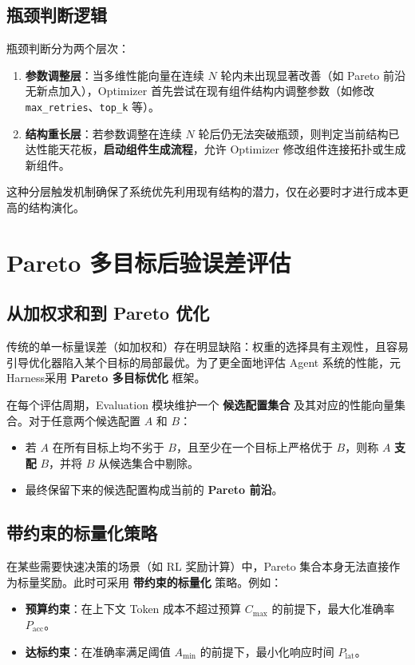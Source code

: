 \subsection{瓶颈判断逻辑}

瓶颈判断分为两个层次：

\begin{enumerate}
    \item \textbf{参数调整层}：当多维性能向量在连续 $N$ 轮内未出现显著改善（如 Pareto 前沿无新点加入），Optimizer 首先尝试在现有组件结构内调整参数（如修改 \texttt{max\_retries}、\texttt{top\_k} 等）。
    \item \textbf{结构重长层}：若参数调整在连续 $N$ 轮后仍无法突破瓶颈，则判定当前结构已达性能天花板，\textbf{启动组件生成流程}，允许 Optimizer 修改组件连接拓扑或生成新组件。
\end{enumerate}

这种分层触发机制确保了系统优先利用现有结构的潜力，仅在必要时才进行成本更高的结构演化。

\section{Pareto 多目标后验误差评估}

\subsection{从加权求和到 Pareto 优化}

传统的单一标量误差（如加权和）存在明显缺陷：权重的选择具有主观性，且容易引导优化器陷入某个目标的局部最优。为了更全面地评估 Agent 系统的性能，元Harness采用 \textbf{Pareto 多目标优化} 框架。

在每个评估周期，Evaluation 模块维护一个 \textbf{候选配置集合} 及其对应的性能向量集合。对于任意两个候选配置 $A$ 和 $B$：
\begin{itemize}
    \item 若 $A$ 在所有目标上均不劣于 $B$，且至少在一个目标上严格优于 $B$，则称 $A$ \textbf{支配} $B$，并将 $B$ 从候选集合中剔除。
    \item 最终保留下来的候选配置构成当前的 \textbf{Pareto 前沿}。
\end{itemize}

\subsection{带约束的标量化策略}

在某些需要快速决策的场景（如 RL 奖励计算）中，Pareto 集合本身无法直接作为标量奖励。此时可采用 \textbf{带约束的标量化} 策略。例如：
\begin{itemize}
    \item \textbf{预算约束}：在上下文 Token 成本不超过预算 $C_{\max}$ 的前提下，最大化准确率 $P_{\text{acc}}$。
    \item \textbf{达标约束}：在准确率满足阈值 $A_{\min}$ 的前提下，最小化响应时间 $P_{\text{lat}}$。
\end{itemize}

